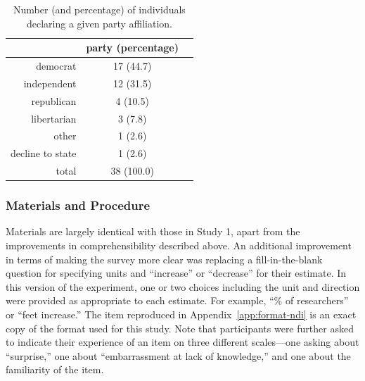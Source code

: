 \begin{table}[ht]
    \caption{Number (and percentage) of individuals declaring a given party
        affiliation.}
    \label{table:CCO-ndi-party}
\centering
\begin{tabular}{rcc}
  \toprule
      & party (percentage) \\ 
  \midrule
  democrat &  17 (44.7) \\ 
  independent &  12 (31.5) \\ 
  republican &   4 (10.5) \\ 
  libertarian &   3 (7.8) \\ 
  other &   1 (2.6) \\ 
  decline to state &   1 (2.6) \\ 
  \midrule
  total &  38 (100.0) \\ 
   \bottomrule
\end{tabular}
\end{table}


\subsubsection{Materials and Procedure}

Materials are largely identical with those in Study 1, apart from the
improvements in comprehensibility described above. An additional improvement in
terms of making the survey more clear was replacing a fill-in-the-blank question
for specifying units and “increase” or “decrease” for their estimate. In this
version of the experiment, one or two choices including the unit and direction
were provided as appropriate to each estimate. For example, “\% of researchers”
or “feet increase.” The item reproduced in Appendix~\ref{app:format-ndi} is an
exact copy of the format used for this study.  Note that participants were
further asked to indicate their experience of an item on three different
scales---one asking about “surprise,” one about “embarrassment at lack of
knowledge,” and one about the familiarity of the item.

